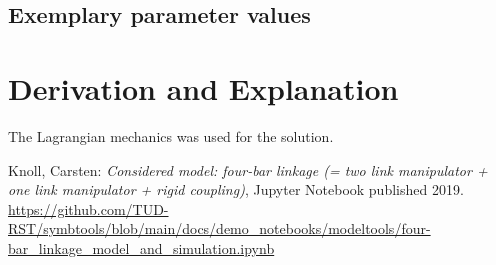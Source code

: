 \documentclass[10pt,a4paper]{article}
\begin{document}
	\subsection{Exemplary parameter values}
	

	
	\section{Derivation and Explanation} %
	The Lagrangian mechanics was used for the solution.
	
	
	\begin{thebibliography}{10}		
		Knoll, Carsten: 
		\textit{Considered model: four-bar linkage (= two link manipulator + one link manipulator + rigid coupling)}, Jupyter Notebook published 2019. \\
		\url{https://github.com/TUD-RST/symbtools/blob/main/docs/demo_notebooks/modeltools/four-bar_linkage_model_and_simulation.ipynb}
	\end{thebibliography}
\end{document}
